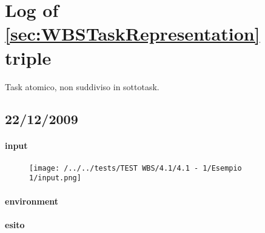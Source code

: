 \section{Log of \ref{sec:WBSTaskRepresentation} triple}

Task atomico, non suddiviso in sottotask.
\subsection{22/12/2009}
\paragraph{input}
\begin{figure}
\centering
\texttt{[image: /../../tests/TEST WBS/4.1/4.1 - 1/Esempio 1/input.png]}
\end{figure}
\paragraph{environment}
\paragraph{esito}



